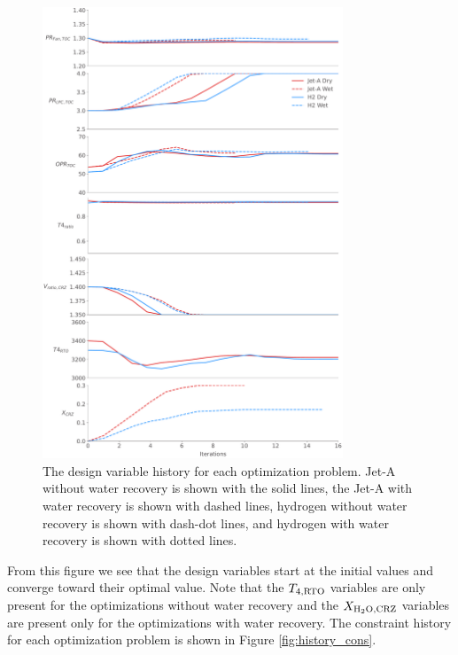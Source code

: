 \documentclass[conf]{new-aiaa}
\begin{document}
\begin{figure}[hbt!]
    \centering
    \includegraphics[width=0.8\textwidth]{dvs.pdf}
    \caption{The design variable history for each optimization problem.
        Jet-A without water recovery is shown with the solid lines, the Jet-A with water recovery is shown with dashed lines, hydrogen without water recovery is shown with dash-dot lines, and hydrogen with water recovery is shown with dotted lines.}
    \label{fig:history_dvs}
\end{figure}

From this figure we see that the design variables start at the initial values and converge toward their optimal value.
Note that the $T_{4,\rm{RTO}}$ variables are only present for the optimizations without water recovery and the $X_{\rm{{H_2O},CRZ}}$ variables are present only for the optimizations with water recovery.
The constraint history for each optimization problem is shown in Figure \ref{fig:history_cons}.
\end{document}
